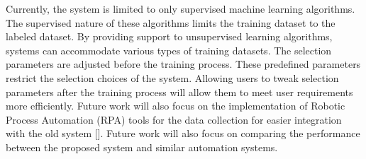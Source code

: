 \documentclass[a4paper,fleqn]{cas-dc}
\begin{document}
Currently, the system is limited to only supervised machine learning algorithms. The supervised nature of these algorithms limits the training dataset to the labeled dataset. By providing support to unsupervised learning algorithms, systems can accommodate various types of training datasets. The selection parameters are adjusted before the training process. These predefined parameters restrict the selection choices of the system. Allowing users to tweak selection parameters after the training process will allow them to meet user requirements more efficiently. Future work will also focus on the implementation of Robotic Process Automation (RPA) tools for the data collection for easier integration with the old system []. Future work will also focus on comparing the performance between the proposed system and similar automation systems.









\end{document}

